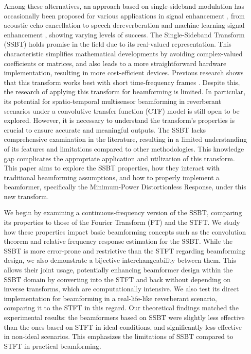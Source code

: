 Among these alternatives, an approach based on single-sideband modulation has occasionally been proposed \cite{crochiere_multirate_1983} for various applications in signal enhancement \cite{wackersreuther_new_1986,harteneck_design_1999}, from acoustic echo cancellation \cite{chin_subband_2001} to speech dereverberation \cite{oyzerman_system_2012} and machine learning signal enhancement \cite{okamoto_subband_2017}, showing varying levels of success. The Single-Sideband Transform (SSBT) holds promise in the field due to its real-valued representation. This characteristic simplifies mathematical developments by avoiding complex-valued coefficients or matrices, and also leads to a more straightforward hardware implementation, resulting in more cost-efficient devices. Previous research shows that this transform works best with short time-frequency frames \cite{okamoto_subband_2017,oyzerman_system_2012}. Despite this, the research of applying this transform for beamforming is limited. In particular, its potential for spatio-temporal multisensor beamforming in reverberant scenarios \cite{zhao_two-stage_2019} under a convolutive transfer function (CTF) model \cite{li_multichannel_2019} is still open to be explored. However, it is necessary to understand the transform's properties is crucial to ensure accurate and meaningful outputs. The SSBT lacks comprehensive examination in the literature, resulting in a limited understanding of its features and limitations compared to other methodologies. This knowledge gap complicates the appropriate application and utilization of this transform. This paper aims to explore the SSBT properties, how they interact with traditional beamforming assumptions, and how to properly implement a beamformer, specifically the Minimum-Power Distortionless Response, under this new transform.


We begin by examining a continuous-frequency version of the SSBT, comparing its properties to those of the Fourier Transform (FT) and the STFT. We study how these properties impact basic beamforming concepts such as the convolution theorem and relative frequency response estimation for the SSBT. While the SSBT is more error-prone and restrictive than the STFT regarding beamforming design, we also demonstrate a bijective interchangeability between them. This allows their joint usage, potentially enhancing beamformer design within the SSBT domain by converting into the STFT and back without depending on inverse transforms, which are computationally intensive. We also test its direct implementation for beamforming in a real-life-like reverberant scenario, comparing it to the STFT in this regard. Our theoretical findings matched the experimental results: the beamformers based on SSBT were slightly less effective than the ones based on STFT in ideal conditions, and significantly less effective in non-ideal scenarios. This emphasizes the limitations of SSBT compared to STFT in practical beamforming.


